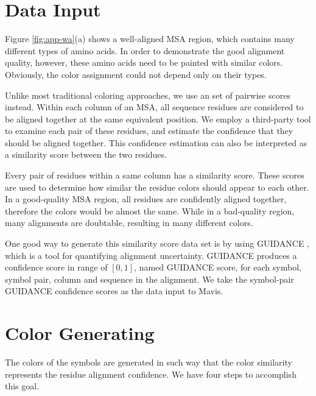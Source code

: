 \section{Data Input}

Figure \ref{fig:app-wa}(a) shows a well-aligned MSA region, which contains many different types of amino acids. In order to demonstrate the good alignment quality, however, these amino acids need to be painted with similar colors. Obviously, the color assignment could not depend only on their types.

Unlike most traditional coloring approaches, we use an set of pairwise scores instead. Within each column of an MSA, all sequence residues are considered to be aligned together at the same equivalent position. We employ a third-party tool to examine each pair of these residues, and estimate the confidence that they should be aligned together. This confidence estimation can also be interpreted as a similarity score between the two residues.

Every pair of residues within a same column has a similarity score. These scores are used to determine how similar the residue colors should appear to each other. In a good-quality MSA region, all residues are confidently aligned together, therefore the colors would be almost the same. While in a bad-quality region, many alignments are doubtable, resulting in many different colors.

One good way to generate this similarity score data set is by using GUIDANCE \cite{Penn:2010aa,Penn:2010ab}, which is a tool for quantifying alignment uncertainty. GUIDANCE produces a confidence score in range of $[0, 1]$, named GUIDANCE score, for each symbol, symbol pair, column and sequence in the alignment. We take the symbol-pair GUIDANCE confidence scores as the data input to Mavis.

\section{Color Generating}

The colors of the symbols are generated in such way that the color similarity represents the residue alignment confidence. We have four steps to accomplish this goal.

